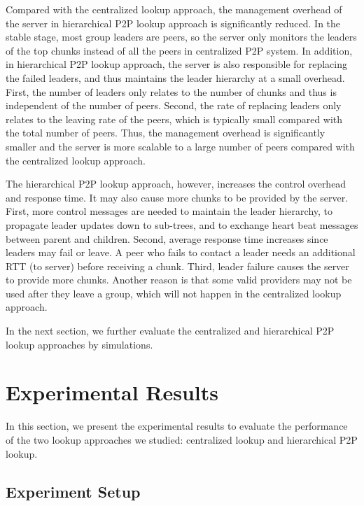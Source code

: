     Compared with the centralized lookup approach, %
    the management overhead of the 
    server in hierarchical P2P lookup approach %
    is significantly reduced. 
    In the stable stage, most group leaders are peers, so the server
    only monitors the leaders of the top chunks instead of all the peers in 
    centralized P2P system. 
    In addition, in hierarchical P2P lookup approach, %
    the server is also responsible
    for replacing the failed leaders, and thus maintains the leader hierarchy
    at a small overhead.
    First, the number of leaders only relates to
    the number of chunks and thus is independent of the number of peers. 
    Second, the rate of replacing leaders 
    only relates to the leaving rate of the peers, which is typically
    small compared with the total number of peers.
    Thus, the management overhead is significantly smaller and the
    server is more scalable to a large number of peers compared
    with the centralized lookup approach. %
    
    The hierarchical P2P lookup approach, %
    however, increases the control overhead and response time. 
    It may also cause more chunks to be provided by the server.
    First, more control messages are needed to maintain the leader
    hierarchy, to propagate leader updates down to sub-trees, and
    to exchange heart beat messages between parent and children. 
    Second, average response time increases since leaders may fail or leave.
    A peer who fails to contact a leader needs an additional RTT (to server) before receiving a chunk. 
    Third, leader failure causes the server to provide more chunks.
    Another reason is that some valid providers
    may not be used after they leave a group, 
    which will not happen in the centralized lookup
    approach. 

    In the next section, we further evaluate the centralized 
    and hierarchical P2P lookup approaches %
    by simulations.

\section{Experimental Results}
\label{s:experiment}
    In this section, we present the experimental results to evaluate 
    the performance of the two lookup approaches we studied: 
    centralized lookup and hierarchical P2P lookup.

\subsection{Experiment Setup}

